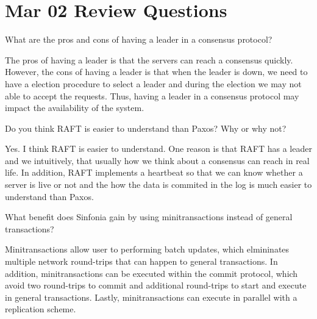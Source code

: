 \section{Mar 02 Review Questions}
\begin{QandA}
   \item What are the pros and cons of having a leader in a consensus protocol?
         \begin{answered}
		 The pros of having a leader is that the servers can reach a consensus quickly. However,
		 the cons of having a leader is that when the leader is down, we need to have a election procedure to select a leader
		 and during the election we may not able to accept the requests. Thus, having a leader in a 
		 consensus protocol may impact the availability of the system.
         \end{answered}

   \item Do you think RAFT is easier to understand than Paxos? Why or why not?
         \begin{answered}
		 Yes. I think RAFT is easier to understand. One reason is that RAFT has a leader and we
		 intuitively, that usually how we think about a consensus can reach in real life. In addition,
		 RAFT implements a heartbeat so that we can know whether a server is live or not and the how the data
		 is commited in the log is much easier to understand than Paxos.
         \end{answered}
         
   \item What benefit does Sinfonia gain by using minitransactions instead of general transactions?
         \begin{answered}
		 Minitransactions allow user to performing batch updates, which elmininates multiple network round-trips
		 that can happen to general transactions. In addition, minitransactions can be executed within the commit protocol,
		 which avoid two round-trips to commit and additional round-trips to start and execute in general transactions.
		 Lastly, minitransactions can execute in parallel with a replication scheme.
         \end{answered}
\end{QandA}




